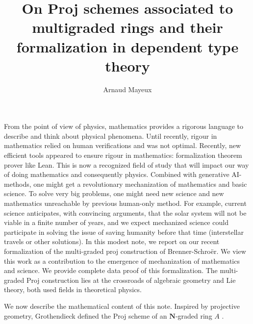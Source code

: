 \documentclass[graybox]{svmult}
\begin{document}
\title*{On Proj schemes associated to multigraded rings and their formalization in dependent type theory}
\author{Arnaud Mayeux}

%
%
\maketitle


From the point of view of physics, mathematics provides a rigorous language to describe and think about physical phenomena. 
Until recently, rigour in mathematics relied on human verifications and was not optimal. Recently, new efficient tools appeared to ensure rigour in mathematics: formalization theorem prover like Lean. 
This is now a recognized field of study that will impact our way of doing mathematics and consequently physics. Combined with generative AI-methods, one might get a revolutionary mechanization of mathematics and basic science. To solve very big problems, one might need new science and new mathematics unreachable by previous human-only method. For example, current science anticipates, with convincing arguments, that the solar system will not be viable in a finite number of years, and we expect mechanized science could participate in solving the issue of saving humanity before that time (interstellar travels or other solutions). In this modest note, we report on our recent formalization of the multi-graded proj construction of Brenner-Schroër. We view this work as a contribution to the emergence of mechanization of mathematics and science. We provide complete data proof of this formalization. The multi-graded Proj construction lies at the crossroads of algebraic geometry and Lie theory, both used fields in theoretical physics.

We now describe the mathematical content of this note. Inspired by projective geometry, Grothendieck defined the Proj scheme of an $\mathbf{N}$-graded ring $A$ \cite{Gr61}.
\end{document}
